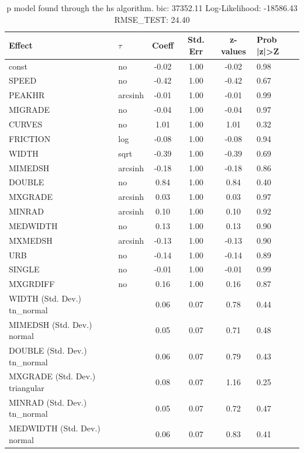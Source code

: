\begin{table}
	\caption{p model found through the hs algorithm. bic: 37352.11 Log-Likelihood: -18586.43 RMSE_TEST: 24.40}
	\begin{center}
		\begin{tabular}{|l|l|c|c|c|l|}
			\hline
			Effect & $\tau$ & Coeff & Std. Err & z-values & Prob |z|>Z \\
			\hline
			const & no & -0.02 & 1.00 & -0.02 & 0.98 \\
			\hline
			SPEED & no & -0.42 & 1.00 & -0.42 & 0.67 \\
			\hline
			PEAKHR & arcsinh & -0.01 & 1.00 & -0.01 & 0.99 \\
			\hline
			MIGRADE & no & -0.04 & 1.00 & -0.04 & 0.97 \\
			\hline
			CURVES & no & 1.01 & 1.00 & 1.01 & 0.32 \\
			\hline
			FRICTION & log & -0.08 & 1.00 & -0.08 & 0.94 \\
			\hline
			WIDTH & sqrt & -0.39 & 1.00 & -0.39 & 0.69 \\
			\hline
			MIMEDSH & arcsinh & -0.18 & 1.00 & -0.18 & 0.86 \\
			\hline
			DOUBLE & no & 0.84 & 1.00 & 0.84 & 0.40 \\
			\hline
			MXGRADE & arcsinh & 0.03 & 1.00 & 0.03 & 0.97 \\
			\hline
			MINRAD & arcsinh & 0.10 & 1.00 & 0.10 & 0.92 \\
			\hline
			MEDWIDTH & no & 0.13 & 1.00 & 0.13 & 0.90 \\
			\hline
			MXMEDSH & arcsinh & -0.13 & 1.00 & -0.13 & 0.90 \\
			\hline
			URB & no & -0.14 & 1.00 & -0.14 & 0.89 \\
			\hline
			SINGLE & no & -0.01 & 1.00 & -0.01 & 0.99 \\
			\hline
			MXGRDIFF & no & 0.16 & 1.00 & 0.16 & 0.87 \\
			\hline
			WIDTH (Std. Dev.) tn_normal &  & 0.06 & 0.07 & 0.78 & 0.44 \\
			\hline
			MIMEDSH (Std. Dev.) normal &  & 0.05 & 0.07 & 0.71 & 0.48 \\
			\hline
			DOUBLE (Std. Dev.) tn_normal &  & 0.06 & 0.07 & 0.79 & 0.43 \\
			\hline
			MXGRADE (Std. Dev.) triangular &  & 0.08 & 0.07 & 1.16 & 0.25 \\
			\hline
			MINRAD (Std. Dev.) tn_normal &  & 0.05 & 0.07 & 0.72 & 0.47 \\
			\hline
			MEDWIDTH (Std. Dev.) normal &  & 0.06 & 0.07 & 0.83 & 0.41 \\

\end{tabular}
\end{center}
\end{table}
